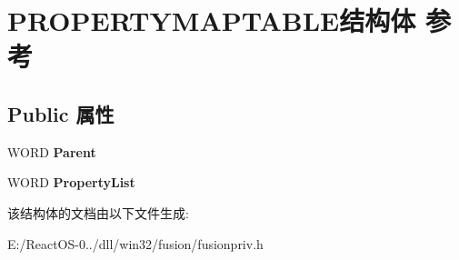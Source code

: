 \hypertarget{struct_p_r_o_p_e_r_t_y_m_a_p_t_a_b_l_e}{}\section{P\+R\+O\+P\+E\+R\+T\+Y\+M\+A\+P\+T\+A\+B\+L\+E结构体 参考}
\label{struct_p_r_o_p_e_r_t_y_m_a_p_t_a_b_l_e}
\subsection*{Public 属性}
\begin{DoxyCompactItemize}
\item 
\mbox{\label{struct_p_r_o_p_e_r_t_y_m_a_p_t_a_b_l_e_a0927fbff36aada398a32933335d1215c}} 
W\+O\+RD {\bfseries Parent}
\item 
\mbox{\label{struct_p_r_o_p_e_r_t_y_m_a_p_t_a_b_l_e_a08d3f373086a87bd3322e5475d4474ea}} 
W\+O\+RD {\bfseries Property\+List}
\end{DoxyCompactItemize}


该结构体的文档由以下文件生成\+:\begin{DoxyCompactItemize}
\item 
E\+:/\+React\+O\+S-\/0../dll/win32/fusion/fusionpriv.\+h\end{DoxyCompactItemize}
